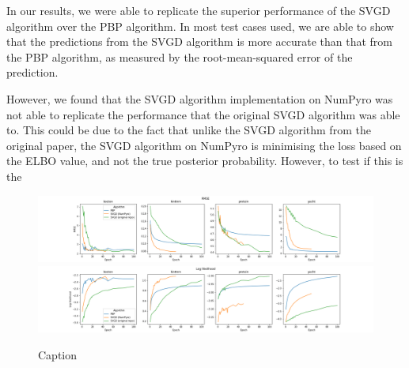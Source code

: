 In our results, we were able to replicate the superior performance of the SVGD algorithm over the PBP algorithm. In most test cases used, we are able to show that the predictions from the SVGD algorithm is more accurate than that from the PBP algorithm, as measured by the root-mean-squared error of the prediction. 

However, we found that the SVGD algorithm implementation on NumPyro was not able to replicate the performance that the original SVGD algorithm was able to. This could be due to the fact that unlike the SVGD algorithm from the original paper, the SVGD algorithm on NumPyro is minimising the loss based on the ELBO value, and not the true posterior probability. However, to test if this is the 

\begin{figure}[h]
    \centering
    \includegraphics[width=\textwidth]{figs/bayesian_epoch_RMSE.png}
    \includegraphics[width=\textwidth]{figs/bayesian_epoch_Loglikelihood.png}
    \caption{Caption}
    \label{fig:my_label}
\end{figure}